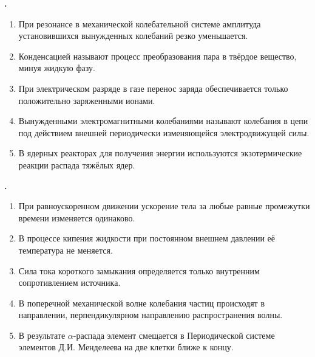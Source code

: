 \documentclass[12pt,a4paper]{article}
\newif\ifShowSolutions
\newcounter{banktask}
\newcommand{\BankTask}[3]{%
  \refstepcounter{banktask}%
  \Needspace{35mm}\par\medskip\noindent\begin{minipage}{\linewidth}%
  \noindent\textbf{\thebanktask.}\quad #2\par
  \ifShowSolutions
    #3\par
    \ifdefined\TutorEdition
      \ifcsname TutorSource#1\endcsname
        \smallskip{\small\csname TutorSource#1\endcsname\par}%
      \fi
    \fi
  \fi
  \end{minipage}\par\medskip
}
\begin{document}
\BankTask{4AE181}{
\begin{enumerate}
\item При резонансе в механической колебательной системе амплитуда установившихся вынужденных колебаний резко уменьшается.
\item Конденсацией называют процесс преобразования пара в твёрдое вещество, минуя жидкую фазу.
\item При электрическом разряде в газе перенос заряда обеспечивается только положительно заряженными ионами.
\item Вынужденными электромагнитными колебаниями называют колебания в цепи под действием внешней периодически изменяющейся электродвижущей силы.
\item В ядерных реакторах для получения энергии используются экзотермические реакции распада тяжёлых ядер.
\end{enumerate}
}{
\smallskip\noindent\textbf{Решение от GPT}\par
1) Неверно: при резонансе амплитуда установившихся вынужденных колебаний резко возрастает. 2) Неверно: конденсация означает переход пара в жидкость, а непосредственный переход в твёрдое состояние называется десублимацией. 3) Неверно: заряд в газе переносят также электроны и отрицательные ионы. 4) Верно: внешняя периодическая ЭДС поддерживает вынужденные электромагнитные колебания. 5) Верно: при делении тяжёлых ядер в реакторе выделяется энергия \(Q=\Delta m c^2>0\); ответ: \(4,\ 5\).
}

\BankTask{51433E}{
\begin{enumerate}
\item При равноускоренном движении ускорение тела за любые равные промежутки времени изменяется одинаково.
\item В процессе кипения жидкости при постоянном внешнем давлении её температура не меняется.
\item Сила тока короткого замыкания определяется только внутренним сопротивлением источника.
\item В поперечной механической волне колебания частиц происходят в направлении, перпендикулярном направлению распространения волны.
\item В результате \(\alpha\)-распада элемент смещается в Периодической системе элементов Д.И. Менделеева на две клетки ближе к концу.
\end{enumerate}
}{
\smallskip\noindent\textbf{Решение от GPT}\par
1) Неверно: при равноускоренном движении ускорение постоянно, \(\vec a=\mathrm{const}\), а за равные промежутки времени одинаково изменяется скорость. 2) Верно: при постоянном внешнем давлении температура кипящей жидкости остаётся постоянной. 3) Неверно: \(I_{\text{кз}}=\mathcal E/r\), поэтому ток зависит и от ЭДС источника, и от его внутреннего сопротивления. 4) Верно: в поперечной волне частицы колеблются перпендикулярно направлению её распространения. 5) Неверно: при \(\alpha\)-распаде \(Z\to Z-2\), поэтому элемент смещается на две клетки к началу таблицы; ответ: \(2,\ 4\).
}
\end{document}
